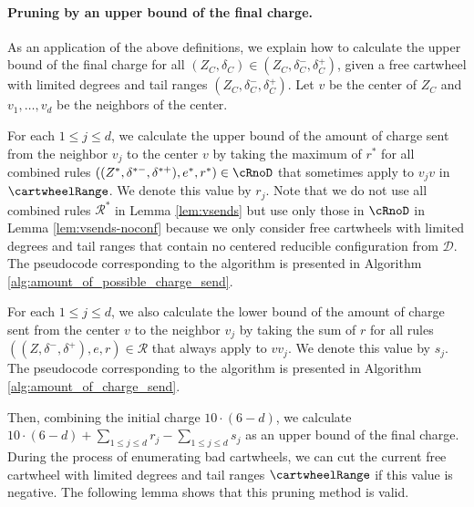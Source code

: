 \documentclass[10pt,a4paper]{article}
\begin{document}
\paragraph{Pruning by an upper bound of the final charge.}
As an application of the above definitions, we explain how to calculate the upper bound of the final charge for all $(Z_C, \delta_C) \in (Z_C, \delta_C^-, \delta_C^+)$, given a free cartwheel with limited degrees and tail ranges $(Z_C, \delta_C^-, \delta_C^+)$.
Let $v$ be the center of $Z_C$ and $v_1, \ldots, v_d$ be the neighbors of the center.

For each $1 \leq j \leq d$, we calculate the upper bound of the amount of charge sent from the neighbor $v_j$ to the center $v$ by taking the maximum of $r^*$ for all combined rules $((Z^*, \delta^{*-}, \delta^{*+}), e^*, r^*) \in \cRnoD$ that sometimes apply to $v_jv$ in $\cartwheelRange$.
We denote this value by $r_j$.
Note that we do not use all combined rules $\mathcal{R}^*$ in Lemma \ref{lem:vsends} but use only those in $\cRnoD$ in Lemma \ref{lem:vsends-noconf} because we only consider free cartwheels with limited degrees and tail ranges that contain no centered reducible configuration from $\mathcal{D}$.
The pseudocode corresponding to the algorithm is presented in Algorithm \ref{alg:amount_of_possible_charge_send}.

For each $1 \leq j \leq d$, we also calculate the lower bound of the amount of charge sent from the center $v$ to the neighbor $v_j$ by taking the sum of $r$ for all rules $((Z, \delta^-, \delta^+), e, r) \in \mathcal{R}$ that always apply to $vv_j$.
We denote this value by $s_j$.
The pseudocode corresponding to the algorithm is presented in Algorithm \ref{alg:amount_of_charge_send}.

Then, combining the initial charge $10 \cdot (6-d)$, we calculate $10 \cdot (6-d) + \sum_{1 \leq j \leq d} r_j - \sum_{1 \leq j \leq d} s_j$ as an upper bound of the final charge.
During the process of enumerating bad cartwheels, we can cut the current free cartwheel with limited degrees and tail ranges $\cartwheelRange$ if this value is negative.
The following lemma shows that this pruning method is valid.
\end{document}
